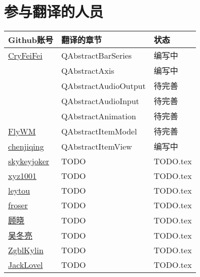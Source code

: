 \chapter{参与翻译的人员}


\begin{tabular}{lll}
	\toprule
	\cmidrule{1-3}
	 Github账号 & 翻译的章节 & 状态\\
	\midrule
	\href{https://github.com/CryFeiFei}{CryFeiFei} & QAbstractBarSeries & 编写中 \\
	 & QAbstractAxis & 编写中 \\
	 & QAbstractAudioOutput & 待完善  \\
	 & QAbstractAudioInput & 待完善  \\
	 & QAbstractAnimation & 待完善\\
	\href{https://github.com/FlyWM}{FlyWM}  & QAbstractItemModel & 待完善 \\
	\href{https://github.com/chenjiqing}{chenjiqing}  & QAbstractItemView & 编写中 \\	
	\href{https://github.com/skykeyjoker}{skykeyjoker}  & TODO & TODO.tex \\	
	\href{https://github.com/xyz1001}{xyz1001}  & TODO & TODO.tex \\	
	\href{https://github.com/leytou}{leytou}  & TODO & TODO.tex \\	
	\href{https://github.com/froser}{froser}  & TODO & TODO.tex \\	
	\href{https://github.com/chenyanzz}{顾晓}  & TODO & TODO.tex \\
    \href{https://github.com/abc881858}{吴冬亮}  & TODO & TODO.tex \\	
    \href{https://github.com/ZgblKylin}{ZgblKylin}  & TODO & TODO.tex \\	
	\href{https://github.com/JackLovel}{JackLovel}  & TODO & TODO.tex \\
	\bottomrule
\end{tabular}

